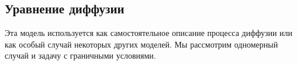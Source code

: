 \documentclass[a4paper, 12pt]{article}
\begin{document}




\subsection{Уравнение диффузии} \label{subsection:diffusion}

Эта модель используется как самостоятельное описание процесса диффузии или как особый случай некоторых других моделей. Мы рассмотрим одномерный случай и задачу с граничными условиями.
\end{document}
